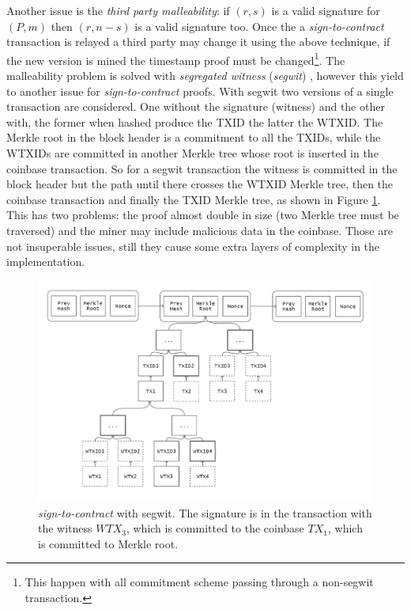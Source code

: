 Another issue is the \textit{third party malleability}:
if $(r,s)$ is a valid signature for $(P,m)$ then $(r,n-s)$ is a valid signature too. Once the a \textit{sign-to-contract} transaction is relayed a third party may change it using the above technique, if the new version is mined the timestamp proof must be changed\footnote{This happen with all commitment scheme passing through a non-segwit transaction.}.
The malleability problem is solved with \textit{segregated witness} (\textit{segwit}) \cite{BIP141}, however this yield to another issue for \textit{sign-to-contract} proofs.
With segwit two versions of a single transaction are considered. One without the signature (witness) and the other with, the former when hashed produce the TXID the latter the WTXID.
The Merkle root in the block header is a commitment to all the TXIDs, while the WTXIDs are committed in another Merkle tree whose root is inserted in the coinbase transaction. So for a segwit transaction the witness is committed in the block header but the path until there crosses the WTXID Merkle tree, then the coinbase transaction and finally the TXID Merkle tree, as shown in Figure \ref{fig:s2c-segwit}. 
This has two problems: the proof almost double in size (two Merkle tree must be traversed) and the miner may include malicious data in the coinbase. Those are not insuperable issues, still they cause some extra layers of complexity in the implementation.

\begin{figure}
	\begin{center}
		\includegraphics[width=\linewidth]{Images/bitcoin-chain-s2c-segwit.png}
		\caption[\textit{sign-to-contract} with segwit.]{\textit{sign-to-contract} with segwit. The signature is in the transaction with the witness $WTX_3$, which is committed to the coinbase $TX_1$, which is committed to Merkle root.}
		\label{fig:s2c-segwit}
	\end{center}
\end{figure} 


